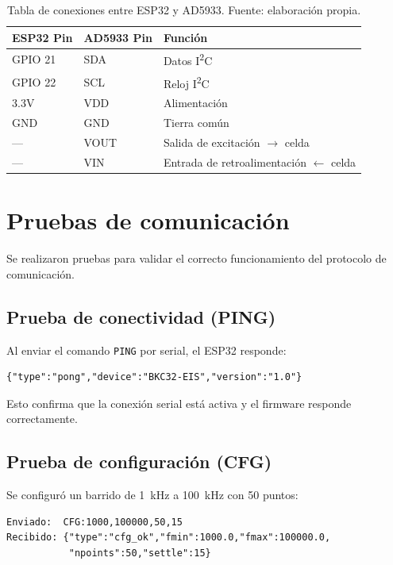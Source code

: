 \documentclass[11pt,a4paper,spanish]{book}
\begin{document}
\begin{table}[h]
	\centering
	\begin{tabular}{l l l}
		\hline\hline
		ESP32 Pin & AD5933 Pin & Funci\'{o}n \\ [0.5ex]
		\hline
		GPIO 21 & SDA  & Datos I\textsuperscript{2}C \\
		GPIO 22 & SCL  & Reloj I\textsuperscript{2}C \\
		3.3V    & VDD  & Alimentaci\'{o}n \\
		GND     & GND  & Tierra com\'{u}n \\
		---     & VOUT & Salida de excitaci\'{o}n $\rightarrow$ celda \\
		---     & VIN  & Entrada de retroalimentaci\'{o}n $\leftarrow$ celda \\
		\hline
	\end{tabular}
	\caption[Conexiones ESP32--AD5933]{Tabla de conexiones entre ESP32 y AD5933. Fuente: elaboraci\'{o}n propia.}
	\label{tab:conexiones}
\end{table}


\chapter{Pruebas de comunicaci\'{o}n}

Se realizaron pruebas para validar el correcto funcionamiento del protocolo de comunicaci\'{o}n.

\section{Prueba de conectividad (PING)}

Al enviar el comando \texttt{PING} por serial, el ESP32 responde:
\begin{lstlisting}
{"type":"pong","device":"BKC32-EIS","version":"1.0"}
\end{lstlisting}
Esto confirma que la conexi\'{o}n serial est\'{a} activa y el firmware responde correctamente.

\section{Prueba de configuraci\'{o}n (CFG)}

Se configur\'{o} un barrido de 1~kHz a 100~kHz con 50 puntos:
\begin{lstlisting}
Enviado:  CFG:1000,100000,50,15
Recibido: {"type":"cfg_ok","fmin":1000.0,"fmax":100000.0,
           "npoints":50,"settle":15}
\end{lstlisting}
\end{document}
